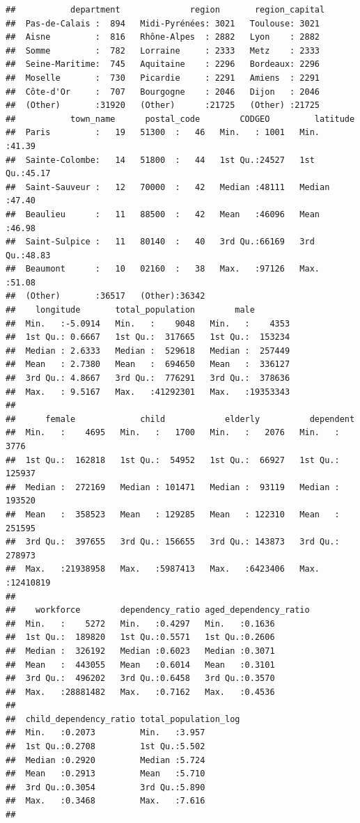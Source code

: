 \documentclass[]{article}
\begin{document}
\begin{verbatim}
##           department              region       region_capital 
##  Pas-de-Calais :  894   Midi-Pyrénées: 3021   Toulouse: 3021  
##  Aisne         :  816   Rhône-Alpes  : 2882   Lyon    : 2882  
##  Somme         :  782   Lorraine     : 2333   Metz    : 2333  
##  Seine-Maritime:  745   Aquitaine    : 2296   Bordeaux: 2296  
##  Moselle       :  730   Picardie     : 2291   Amiens  : 2291  
##  Côte-d'Or     :  707   Bourgogne    : 2046   Dijon   : 2046  
##  (Other)       :31920   (Other)      :21725   (Other) :21725  
##           town_name      postal_code        CODGEO         latitude    
##  Paris         :   19   51300  :   46   Min.   : 1001   Min.   :41.39  
##  Sainte-Colombe:   14   51800  :   44   1st Qu.:24527   1st Qu.:45.17  
##  Saint-Sauveur :   12   70000  :   42   Median :48111   Median :47.40  
##  Beaulieu      :   11   88500  :   42   Mean   :46096   Mean   :46.98  
##  Saint-Sulpice :   11   80140  :   40   3rd Qu.:66169   3rd Qu.:48.83  
##  Beaumont      :   10   02160  :   38   Max.   :97126   Max.   :51.08  
##  (Other)       :36517   (Other):36342                                  
##    longitude       total_population        male         
##  Min.   :-5.0914   Min.   :    9048   Min.   :    4353  
##  1st Qu.: 0.6667   1st Qu.:  317665   1st Qu.:  153234  
##  Median : 2.6333   Median :  529618   Median :  257449  
##  Mean   : 2.7380   Mean   :  694650   Mean   :  336127  
##  3rd Qu.: 4.8667   3rd Qu.:  776291   3rd Qu.:  378636  
##  Max.   : 9.5167   Max.   :41292301   Max.   :19353343  
##                                                         
##      female             child            elderly          dependent       
##  Min.   :    4695   Min.   :   1700   Min.   :   2076   Min.   :    3776  
##  1st Qu.:  162818   1st Qu.:  54952   1st Qu.:  66927   1st Qu.:  125937  
##  Median :  272169   Median : 101471   Median :  93119   Median :  193520  
##  Mean   :  358523   Mean   : 129285   Mean   : 122310   Mean   :  251595  
##  3rd Qu.:  397655   3rd Qu.: 156655   3rd Qu.: 143873   3rd Qu.:  278973  
##  Max.   :21938958   Max.   :5987413   Max.   :6423406   Max.   :12410819  
##                                                                           
##    workforce        dependency_ratio aged_dependency_ratio
##  Min.   :    5272   Min.   :0.4297   Min.   :0.1636       
##  1st Qu.:  189820   1st Qu.:0.5571   1st Qu.:0.2606       
##  Median :  326192   Median :0.6023   Median :0.3071       
##  Mean   :  443055   Mean   :0.6014   Mean   :0.3101       
##  3rd Qu.:  496202   3rd Qu.:0.6458   3rd Qu.:0.3570       
##  Max.   :28881482   Max.   :0.7162   Max.   :0.4536       
##                                                           
##  child_dependency_ratio total_population_log
##  Min.   :0.2073         Min.   :3.957       
##  1st Qu.:0.2708         1st Qu.:5.502       
##  Median :0.2920         Median :5.724       
##  Mean   :0.2913         Mean   :5.710       
##  3rd Qu.:0.3054         3rd Qu.:5.890       
##  Max.   :0.3468         Max.   :7.616       
## 
\end{verbatim}
\end{document}
